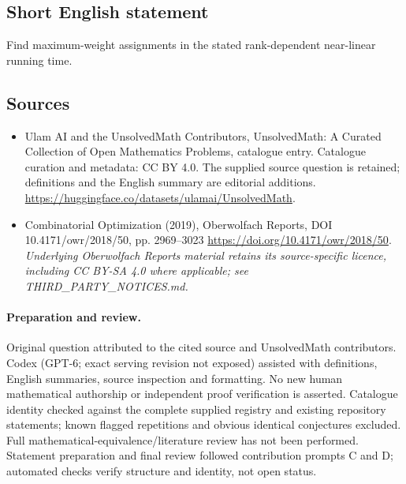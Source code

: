 \documentclass[11pt]{article}
\begin{document}
\subsection{Short English statement}
Find maximum-weight assignments in the stated rank-dependent near-linear running time.
\subsection{Sources}
\begin{itemize}
\item[\hypertarget{source:statement:1}{S1}] Ulam AI and the UnsolvedMath Contributors, UnsolvedMath: A Curated Collection of Open Mathematics Problems, catalogue entry. Catalogue curation and metadata: CC BY 4.0. The supplied source question is retained; definitions and the English summary are editorial additions.
\url{https://huggingface.co/datasets/ulamai/UnsolvedMath}.
\item[\hypertarget{source:statement:2}{S2}] Combinatorial Optimization (2019), Oberwolfach Reports, DOI 10.4171/owr/2018/50, pp. 2969--3023
\url{https://doi.org/10.4171/owr/2018/50}.
\textit{Underlying Oberwolfach Reports material retains its source-specific licence, including CC BY-SA 4.0 where applicable; see THIRD\_PARTY\_NOTICES.md.}
\end{itemize}
\paragraph{Preparation and review.}
Original question attributed to the cited source and UnsolvedMath contributors. Codex (GPT-6; exact serving revision not exposed) assisted with definitions, English summaries, source inspection and formatting. No new human mathematical authorship or independent proof verification is asserted. Catalogue identity checked against the complete supplied registry and existing repository statements; known flagged repetitions and obvious identical conjectures excluded. Full mathematical-equivalence/literature review has not been performed. Statement preparation and final review followed contribution prompts C and D; automated checks verify structure and identity, not open status.
\label{end:statement}
\end{document}
